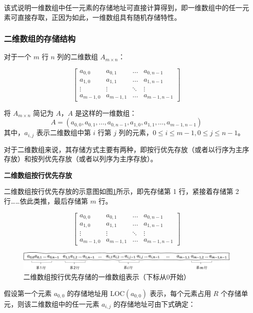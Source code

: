 \documentclass[lang=cn,newtx,10pt,scheme=chinese]{elegantbook}
\begin{document}
该式说明一维数组中任一元素的存储地址可直接计算得到，即一维数组中的任一元素可直接存取，正因为如此，一维数组具有随机存储特性。
\subsubsection{二维数组的存储结构}

对于一个 $m$ 行 $n$ 列的二维数组 $A_{m \times n}$：

\[
\begin{bmatrix}
a_{0,0} & a_{0,1} & \dots & a_{0,n-1} \\
a_{1,0} & a_{1,1} & \dots & a_{1,n-1} \\
\vdots & \vdots & \ddots & \vdots \\
a_{m-1,0} & a_{m-1,1} & \dots & a_{m-1,n-1}
\end{bmatrix}
\]

将 $A_{m \times n}$ 简记为 $A$，$A$ 是这样的一维数组：
\[
A = (a_{0,0}, a_{0,1}, \dots, a_{0,n-1}, a_{1,0}, a_{1,1}, \dots, a_{m-1,n-1})
\]
其中，$a_{i,j}$ 表示二维数组中第 $i$ 行第 $j$ 列的元素，$0 \leq i \leq m -1 , 0 \leq j \leq n-1$。

对于二维数组来说，其存储方式主要有两种，即按行优先存放（或者以行序为主序存放）和按列优先存放（或者以列序为主序存放）。

\textbf{二维数组按行优先存放}

二维数组按行优先存放的示意图如图\ref{fig:row_major_array}所示，即先存储第 1 行，紧接着存储第 2 行……依此类推，最后存储第 $m$ 行。

\[
\begin{bmatrix}
a_{0,0} & a_{0,1} & \dots & a_{0,n-1} \\
a_{1,0} & a_{1,1} & \dots & a_{1,n-1} \\
\vdots & \vdots & \ddots & \vdots \\
a_{m-1,0} & a_{m-1,1} & \dots & a_{m-1,n-1}
\end{bmatrix}
\]

\begin{figure}[h]
  \centering
  \includegraphics[width=1\textwidth]{./figure/pdf/cropped/rowFirst.pdf}
  \caption{二维数组按行优先存储的一维数组表示（下标从0开始）}
  \label{fig:row_major_array}
\end{figure}

假设第一个元素 $a_{0,0}$ 的存储地址用 $\text{LOC}(a_{0,0})$ 表示，每个元素占用 $R$ 个存储单元，则该二维数组中的任一元素 $a_{i,j}$ 的存储地址可由下式确定：
\end{document}
